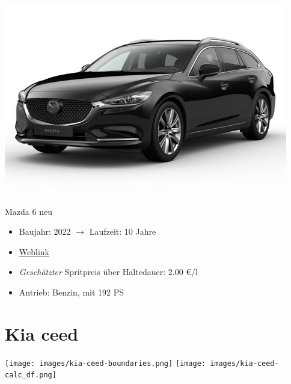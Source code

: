 \documentclass[landscape, DIV=99, 14pt]{scrartcl}
\begin{document}
\pagebreak
\null
\vspace{2cm}
\begin{center}
\includegraphics[width=0.9\columnwidth]{cars/mazda-6-neu.png}

Mazda 6 neu
\end{center}

\begin{itemize}
    \item Baujahr: 2022 $\rightarrow$ Laufzeit: 10 Jahre
    \item \href{https://konfigurator.meinauto.de/mazda/neuwagen/48-6/angebote/6-kombi/konfigurator/\#!/extras/exclusive-line/8846370/10,11/private/65352-5416-204698/984/61c9aa657e74c/cash-purchase/32545--287374/48,0,10000,0,0,0,0,0,}{Weblink}
    \item \emph{Gesch\"atzter} Spritpreis \"uber Haltedauer: 2.00 \euro{}/l
    \item Antrieb: Benzin, mit 192 PS
\end{itemize}

\pagebreak


\twocolumn

\section*{Kia ceed}
\begin{center}
\texttt{[image: images/kia-ceed-boundaries.png]}
\null
\vspace{0.5cm}
\texttt{[image: images/kia-ceed-calc\_df.png]}
\end{center}
\end{document}
